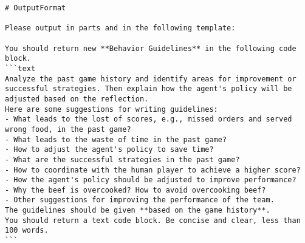 \begin{lstlisting}
# OutputFormat

Please output in parts and in the following template:

You should return new **Behavior Guidelines** in the following code block.
```text
Analyze the past game history and identify areas for improvement or successful strategies. Then explain how the agent's policy will be adjusted based on the reflection.
Here are some suggestions for writing guidelines:
- What leads to the lost of scores, e.g., missed orders and served wrong food, in the past game?
- What leads to the waste of time in the past game?
- How to adjust the agent's policy to save time?
- What are the successful strategies in the past game?
- How to coordinate with the human player to achieve a higher score?
- How the agent's policy should be adjusted to improve performance?
- Why the beef is overcooked? How to avoid overcooking beef?
- Other suggestions for improving the performance of the team.
The guidelines should be given **based on the game history**.
You should return a text code block. Be concise and clear, less than 100 words.
```
\end{lstlisting}